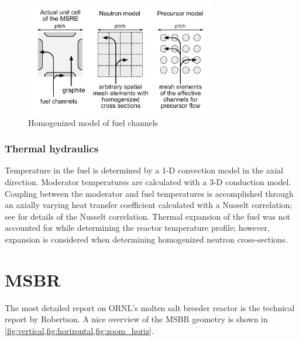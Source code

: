 \documentclass{article}
\begin{document}
\begin{figure}[htpb]
  \centering
  \includegraphics{kophazi_neutronics_discretization.png}
  \caption{Homogenized model of fuel channels \cite{kophazi_development_????}}
  \label{fig:kophazi_homo}
\end{figure}

\subsubsection{Thermal hydraulics}

Temperature in the fuel is determined by a 1-D convection model in the axial
direction. Moderator temperatures are calculated with a 3-D conduction
model. Coupling between the moderator and fuel temperatures is accomplished
through an axially varying heat transfer coefficient calculated with a Nusselt
correlation; see \cite{kophazi_development_????} for details of the Nusselt
correlation. Thermal expansion of the fuel was not accounted for while
determining the reactor temperature profile; however, expansion is considered
when determining homogenized neutron cross-sections.

\section{MSBR}

The most detailed report on ORNL's molten salt breeder reactor is the technical
report by Robertson. \cite{robertson_conceptual_1971} A nice overview of the
MSBR geometry is shown in \cref{fig:vertical,fig:horizontal,fig:zoom_horiz}.
\end{document}
